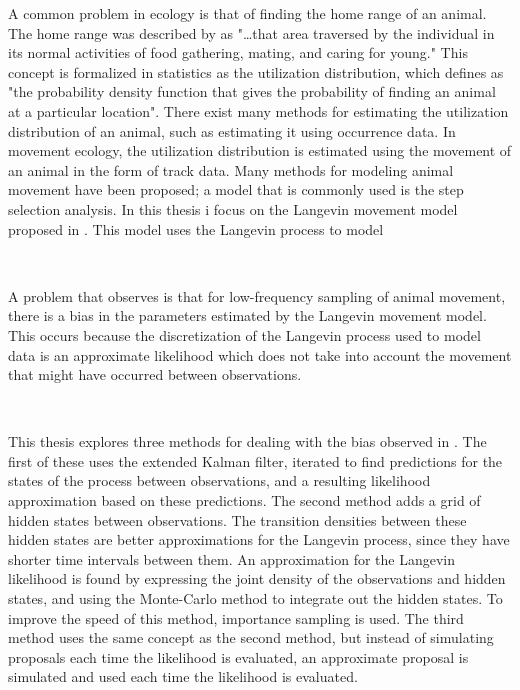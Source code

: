
A common problem in ecology is that of finding the home range of an animal. The home range was described by \parencite{burt1943territoriality} as "\dots that area traversed by the individual in its normal activities of food gathering, mating, and caring for young." This concept is formalized in statistics as the utilization distribution, which \parencite{anderson1982home} defines as "the probability density function that gives the probability of finding an animal at a particular location". There exist many methods for estimating the utilization distribution of an animal, such as estimating it using occurrence data. In movement ecology, the utilization distribution is estimated using the movement of an animal in the form of track data. Many methods for modeling animal movement have been proposed; a model that is commonly used is the step selection analysis. In this thesis i focus on the Langevin movement model proposed in \parencite{michelot_langevin_2019}. This model uses the Langevin process to model 

\

A problem that \parencite{michelot_langevin_2019} observes is that for low-frequency sampling of animal movement, there is a bias in the parameters estimated by the Langevin movement model. This occurs because the discretization of the Langevin process used to model data is an approximate likelihood which does not take into account the movement that might have occurred between observations. 

\

This thesis explores three methods for dealing with the bias observed in \parencite{michelot_langevin_2019}. The first of these uses the extended Kalman filter, iterated to find predictions for the states of the process between observations, and a resulting likelihood approximation based on these predictions. The second method adds a grid of hidden states between observations. The transition densities between these hidden states are better approximations for the Langevin process, since they have shorter time intervals between them. An approximation for the Langevin likelihood is found by expressing the joint density of the observations and hidden states, and using the Monte-Carlo method to integrate out the hidden states. To improve the speed of this method, importance sampling is used. The third method uses the same concept as the second method, but instead of simulating proposals each time the likelihood is evaluated, an approximate proposal is simulated and used each time the likelihood is evaluated. 

